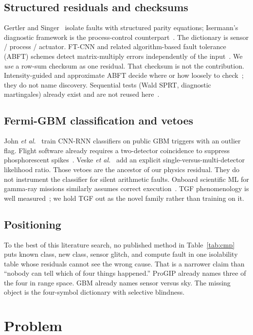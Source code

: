 \documentclass[journal]{IEEEtran}
\begin{document}
\subsection{Structured residuals and checksums}
Gertler and Singer~\cite{gertler1990} isolate faults with structured parity equations; Isermann's diagnostic framework is the process-control counterpart~\cite{isermann2006}. The dictionary is sensor / process / actuator. FT-CNN and related algorithm-based fault tolerance (ABFT) schemes detect matrix-multiply errors independently of the input~\cite{ftcnn2020,zhao2010}. We \emph{use} a row-sum checksum as one residual. That checksum is not the contribution. Intensity-guided and approximate ABFT decide where or how loosely to check~\cite{hastings2021,approxabft2023}; they do not name discovery. Sequential tests (Wald SPRT, diagnostic martingales) already exist and are not reused here~\cite{wald1947,hindy2025}.

\subsection{Fermi-GBM classification and vetoes}
John \textit{et al.}~\cite{john2025} train CNN-RNN classifiers on public GBM triggers with an outlier flag. Flight software already requires a two-detector coincidence to suppress phosphorescent spikes~\cite{meegan2009,paciesas2012}. Veske \textit{et al.}~\cite{veske2025} add an explicit single-versus-multi-detector likelihood ratio. Those vetoes are the ancestor of our physics residual. They do not instrument the classifier for silent arithmetic faults. Onboard scientific ML for gamma-ray missions similarly assumes correct execution~\cite{bulgarelli2025}. TGF phenomenology is well measured~\cite{briggs2013,roberts2018}; we hold TGF out as the novel family rather than training on it.

\subsection{Positioning}
To the best of this literature search, no published method in Table~\ref{tab:cmp} puts known class, new class, sensor glitch, and compute fault in one isolability table whose residuals cannot see the wrong cause. That is a narrower claim than ``nobody can tell which of four things happened.'' ProGIP already names three of the four in range space. GBM already names sensor versus sky. The missing object is the four-symbol dictionary with selective blindness.

\section{Problem}
\end{document}
